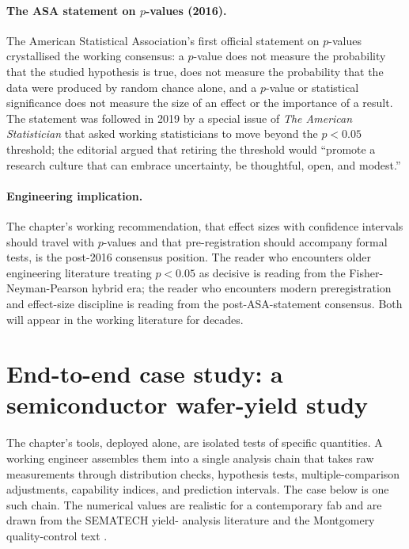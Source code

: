 \paragraph{The ASA statement on $p$-values (2016).} The
American Statistical Association's first official statement
on $p$-values \cite{method:ch08-wasserstein-asa-2016} crystallised
the working consensus: a $p$-value does not measure the
probability that the studied hypothesis is true, does not
measure the probability that the data were produced by random
chance alone, and a $p$-value or statistical significance does
not measure the size of an effect or the importance of a
result. The statement was followed in 2019 by a special issue
of \emph{The American Statistician}
\cite{paper:ch08t3-wasserstein-2019} that asked
working statisticians to move beyond the $p < 0.05$ threshold;
the editorial argued that retiring the threshold would
``promote a research culture that can embrace uncertainty,
be thoughtful, open, and modest.''

\paragraph{Engineering implication.} The chapter's working
recommendation, that effect sizes with confidence intervals
should travel with $p$-values and that pre-registration should
accompany formal tests, is the post-2016 consensus position.
The reader who encounters older engineering literature
treating $p < 0.05$ as decisive is reading from the
Fisher-Neyman-Pearson hybrid era; the reader who encounters
modern preregistration and effect-size discipline is reading
from the post-ASA-statement consensus. Both will appear in
the working literature for decades.

\section{End-to-end case study: a semiconductor wafer-yield
study}

The chapter's tools, deployed alone, are isolated tests of
specific quantities. A working engineer assembles them into a
single analysis chain that takes raw measurements through
distribution checks, hypothesis tests, multiple-comparison
adjustments, capability indices, and prediction intervals. The
case below is one such chain. The numerical values are realistic
for a contemporary fab and are drawn from the SEMATECH yield-
analysis literature \cite{web:ch08t3b-sematech-yield-2009} and
the Montgomery quality-control text
\cite[ch.~11]{text:ch08-montgomery-spc-2019}.

